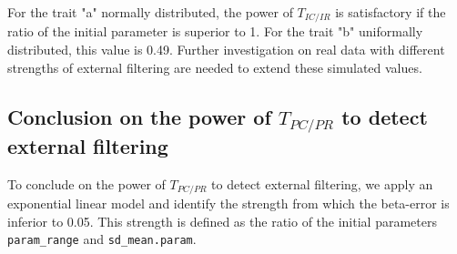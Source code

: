 \documentclass[12pt]{article}\usepackage[]{graphicx}\usepackage[]{color}
\begin{document}
For the trait "a" normally distributed, the power of $T_{IC/IR}$ is satisfactory if the ratio of the initial parameter is superior to
 1. For the trait "b" uniformally distributed, this value is 0.49. 
 Further investigation on real data with different strengths of external filtering are needed to extend these simulated values.

 




  \subsection {Conclusion on the power of $T_{PC/PR}$ to detect external filtering}

To conclude on the power of $T_{PC/PR}$ to detect external filtering, we apply an exponential linear model and identify the strength from which the beta-error is inferior to 0.05. This strength is defined as the ratio of the initial parameters \texttt{param\_range} and \texttt{sd\_mean.param}. 
\end{document}
